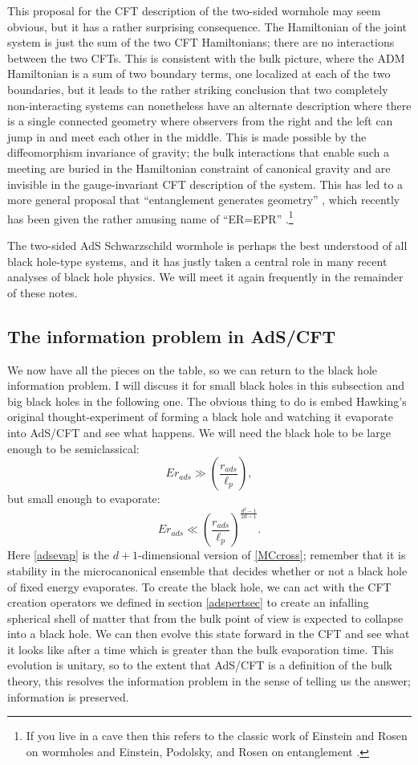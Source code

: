 \documentclass[12pt]{article}
\newcommand{\be}{\begin{equation}}
\newcommand{\ee}{\end{equation}}
\begin{document}
This proposal for the CFT description of the two-sided wormhole may seem obvious, but it has a rather surprising consequence.  The Hamiltonian of the joint system is just the sum of the two CFT Hamiltonians; there are no interactions between the two CFTs.  This is consistent with the bulk picture, where the ADM Hamiltonian is a sum of two boundary terms, one localized at each of the two boundaries, but it leads to the rather striking conclusion that two completely non-interacting systems can nonetheless have an alternate description where there is a single connected geometry where observers from the right and the left can jump in and meet each other in the middle.  This is made possible by the diffeomorphism invariance of gravity; the bulk interactions that enable such a meeting are buried in the Hamiltonian constraint of canonical gravity and are invisible in the gauge-invariant CFT description of the system.  This has led to a more general proposal that ``entanglement generates geometry'' \cite{VanRaamsdonk:2010pw}, which recently has been given the rather amusing name of ``ER=EPR'' \cite{Maldacena:2013xja}.\footnote{If you live in a cave then this refers to the classic work of Einstein and Rosen on wormholes and Einstein, Podolsky, and Rosen on entanglement \cite{Einstein:1935tc,Einstein:1935rr}.}

The two-sided AdS Schwarzschild wormhole is perhaps the best understood of all black hole-type systems, and it has justly taken a central role in many recent analyses of black hole physics.  We will meet it again frequently in the remainder of these notes.  

\subsection{The information problem in AdS/CFT}
We now have all the pieces on the table, so we can return to the black hole information problem.  I will discuss it for small black holes in this subsection and big black holes in the following one.  The obvious thing to do is embed Hawking's original thought-experiment of forming a black hole and watching it evaporate into AdS/CFT and see what happens.  We will need the black hole to be large enough to be semiclassical:
\be\label{adssc}
E r_{\mathit{ads}}\gg \left(\frac{r_{\mathit{ads}}}{\ell_p}\right),
\ee
but small enough to evaporate:
\be\label{adsevap}
E r_{\mathit{ads}}\ll \left(\frac{r_{\mathit{ads}}}{\ell_p}\right)^{\frac{d^2-1}{2d-1}}.
\ee
Here \eqref{adsevap} is the $d+1$-dimensional version of \eqref{MCcross}; remember that it is stability in the microcanonical ensemble that decides whether or not a black hole of fixed energy evaporates.  To create the black hole, we can act with the CFT creation operators we defined in section \ref{adspertsec} to create an infalling spherical shell of matter that from the bulk point of view is expected to collapse into a black hole.  We can then evolve this state forward in the CFT and see what it looks like after a time which is greater than the bulk evaporation time.  This evolution is unitary, so to the extent that AdS/CFT is a definition of the bulk theory, this resolves the information problem in the sense of telling us the answer; information is preserved.  
\end{document}
